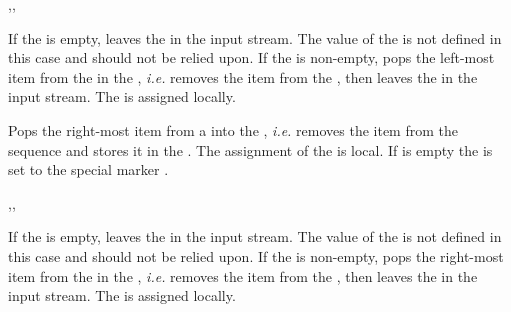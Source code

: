 \documentclass[oneside]{book}
\begin{document}
\begin{function}{\SeqPopLeftT,\SeqPopLeftF,\SeqPopLeftTF}
\begin{syntax}
   
   
    
\end{syntax}
If the  is empty, leaves the  in the
input stream.  The value of the  is
not defined in this case and should not be relied upon.  If the
 is non-empty, pops the left-most item from the 
in the , \emph{i.e.} removes the item from the
, then leaves the  in the input stream.
The  is assigned locally.
\begin{demohigh}
\SeqPopLeftTF \cEmptySeq {} {}
\end{demohigh}
\end{function}

\begin{function}{\SeqPopRight}
\begin{syntax}
  
\end{syntax}
Pops the right-most item from a  into the
, \emph{i.e.} removes the item from the
sequence and stores it in the .
The assignment of the  is local.
If  is empty the 
is set to the special marker .
\begin{demohigh}
\SeqSetFromClist {}
\SeqPopRight \lTmpaSeq \lTmpaTl
\SeqVarJoin \lTmpaSeq {,}
\end{demohigh}
\end{function}

\begin{function}{\SeqPopRightT,\SeqPopRightF,\SeqPopRightTF}
\begin{syntax}
   
   
    
\end{syntax}
If the  is empty, leaves the  in the
input stream.  The value of the  is
not defined in this case and should not be relied upon.  If the
 is non-empty, pops the right-most item from the 
in the , \emph{i.e.} removes the item from the
, then leaves the  in the input stream.
The  is assigned locally.
\begin{demohigh}
\SeqPopRightTF \cEmptySeq {} {}
\end{demohigh}
\end{function}
\end{document}
